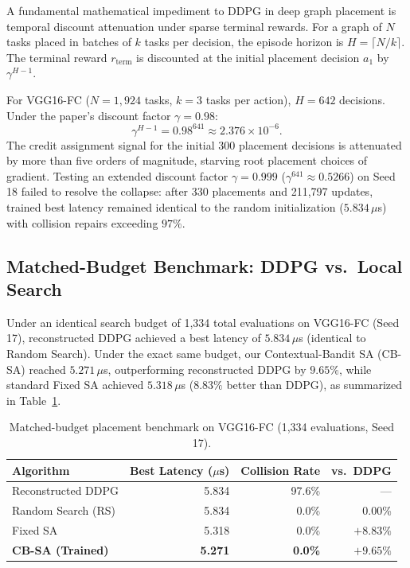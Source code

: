 \documentclass[10pt,conference]{IEEEtran}
\begin{document}
A fundamental mathematical impediment to DDPG in deep graph placement is
temporal discount attenuation under sparse terminal rewards.  For a graph of
$N$ tasks placed in batches of $k$ tasks per decision, the episode horizon is
$H = \lceil N/k \rceil$.  The terminal reward $r_{\text{term}}$ is discounted
at the initial placement decision $a_1$ by $\gamma^{H-1}$.

For VGG16-FC ($N = 1,924$ tasks, $k = 3$ tasks per action), $H = 642$ decisions.
Under the paper's discount factor $\gamma = 0.98$:
\begin{equation}
  \gamma^{H-1} = 0.98^{641} \approx 2.376 \times 10^{-6}.
\end{equation}
The credit assignment signal for the initial 300 placement decisions is attenuated
by more than five orders of magnitude, starving root placement choices of gradient.
Testing an extended discount factor $\gamma = 0.999$ ($\gamma^{641} \approx 0.5266$)
on Seed 18 failed to resolve the collapse: after 330 placements and 211,797 updates,
trained best latency remained identical to the random initialization ($5.834\,\mu$s)
with collision repairs exceeding $97\%$.

\subsection{Matched-Budget Benchmark: DDPG vs.\ Local Search}
\label{sec:matched-ddpg}

Under an identical search budget of 1,334 total evaluations on VGG16-FC (Seed 17),
reconstructed DDPG achieved a best latency of $5.834\,\mu$s (identical to Random Search).
Under the exact same budget, our Contextual-Bandit SA (CB-SA) reached $5.271\,\mu$s,
outperforming reconstructed DDPG by $\mathbf{9.65\%}$, while standard Fixed SA achieved
$5.318\,\mu$s ($\mathbf{8.83\%}$ better than DDPG), as summarized in Table~\ref{tab:matched-ddpg}.

\begin{table}[htbp]
  \caption{Matched-budget placement benchmark on VGG16-FC (1,334 evaluations, Seed 17).}
  \label{tab:matched-ddpg}
  \centering
  \small
  \begin{tabular}{lrrr}
    \toprule
    Algorithm & Best Latency ($\mu$s) & Collision Rate & vs.\ DDPG \\
    \midrule
    Reconstructed DDPG & 5.834 & 97.6\% & --- \\
    Random Search (RS) & 5.834 & 0.0\% & 0.00\% \\
    Fixed SA           & 5.318 & 0.0\% & $+8.83\%$ \\
    \textbf{CB-SA (Trained)} & \textbf{5.271} & \textbf{0.0\%} & $\mathbf{+9.65\%}$ \\
    \bottomrule
  \end{tabular}
\end{table}
\end{document}

